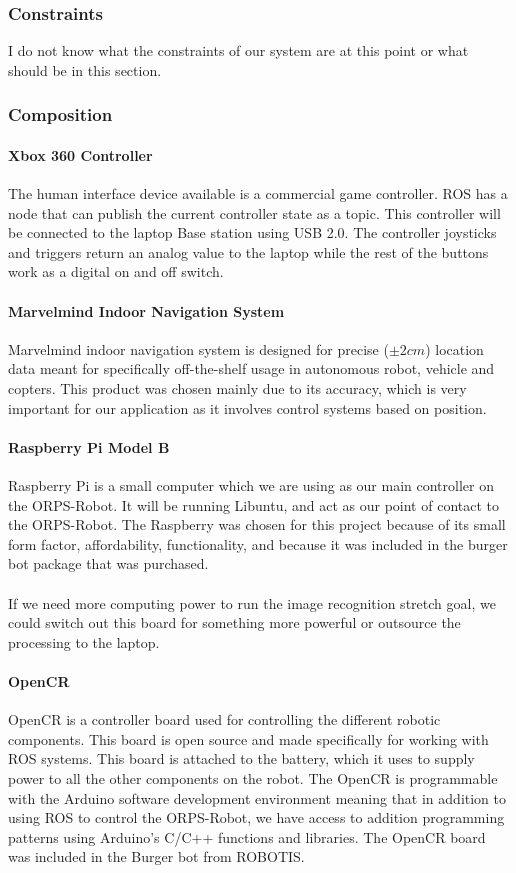 \documentclass[english,12pt]{article}
\begin{document}
\subsubsection{Constraints}
I do not know what the constraints of our system are at this point or what should be in this
section.
\subsubsection{Composition}
\paragraph{Xbox 360 Controller}
The human interface device available is a commercial game controller. ROS has a node that can publish
the current controller state as a topic. This controller will be connected to the laptop Base station using
USB 2.0. The controller joysticks and triggers return an analog value to the laptop while the rest of the
buttons work as a digital on and off switch.
\paragraph{Marvelmind Indoor Navigation System}
Marvelmind indoor navigation system is designed for precise ($\pm 2 cm$) location data meant for
specifically off-the-shelf usage in autonomous robot, vehicle and copters. This product was chosen
mainly due to its accuracy, which is very important for our application as it involves control systems
based on position.
\paragraph{Raspberry Pi Model B}
Raspberry Pi is a small computer which we are using as our main controller on the ORPS-Robot. It will be
running Libuntu, and act as our point of contact to the ORPS-Robot. The Raspberry was chosen for this
project because of its small form factor, affordability, functionality, and because it was included in the
burger bot package that was purchased.\\\\
If we need more computing power to run the image recognition stretch goal, we could switch out this
board for something more powerful or outsource the processing to the laptop.
\paragraph{OpenCR}
OpenCR is a controller board used for controlling the different robotic components. This board is open
source and made specifically for working with ROS systems. This board is attached to the battery, which
it uses to supply power to all the other components on the robot. The OpenCR is programmable with
the Arduino software development environment meaning that in addition to using ROS to control the
ORPS-Robot, we have access to addition programming patterns using Arduino’s C/C++ functions and
libraries. The OpenCR board was included in the Burger bot from ROBOTIS.
\end{document}
